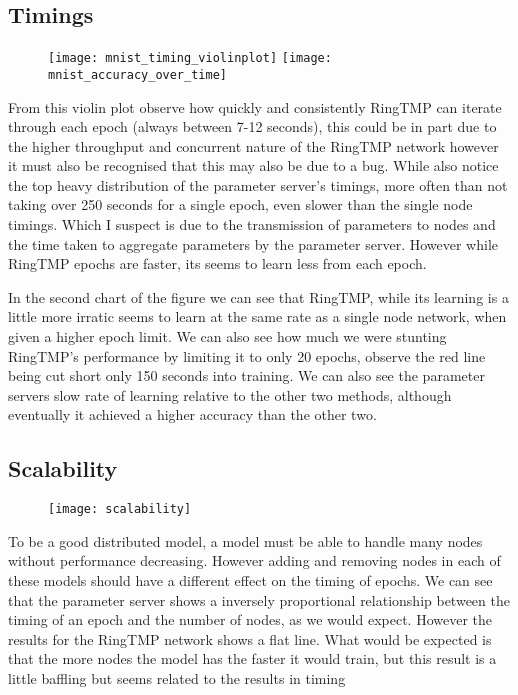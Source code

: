 
\subsection{Timings}

\begin{figure}[h]
    \centering 
    \texttt{[image: mnist\_timing\_violinplot]}
    \texttt{[image: mnist\_accuracy\_over\_time]}

\end{figure}

From this violin plot observe how quickly and consistently RingTMP can iterate
through each epoch (always between 7-12 seconds), this could be in part due to
the higher throughput and concurrent nature of the RingTMP network however it
must also be recognised that this may also be due to a bug. While also notice
the top heavy distribution of the parameter server's timings, more often than not
taking over 250 seconds for a single epoch, even slower than the single node
timings. Which I suspect is due to the transmission of parameters to nodes and
the time taken to aggregate parameters by the parameter server. However while
RingTMP epochs are faster, its seems to learn less from each epoch.

In the second chart of the figure we can see that RingTMP, while its learning is
a little more irratic seems to learn at the same rate as a single node network, when
given a higher epoch limit. We can also see how much we were stunting RingTMP's
performance by limiting it to only 20 epochs, observe the red line being cut
short only 150 seconds into training. We can also see the parameter servers slow
rate of learning relative to the other two methods, although eventually it
achieved a higher accuracy than the other two.
\clearpage
\subsection{Scalability}
\begin{figure}[h]
    \centering
    \texttt{[image: scalability]}
\end{figure}

To be a good distributed model, a model must be able to handle many nodes
without performance decreasing. However adding and removing nodes in each of
these models should have a different effect on the timing of epochs. We can see
that the parameter server shows a inversely proportional relationship between
the timing of an epoch and the number of nodes, as we would expect. However the
results for the RingTMP network shows a flat line. What would be expected is
that the more nodes the model has the faster it would train, but this result is
a little baffling but seems related to the results in timing

